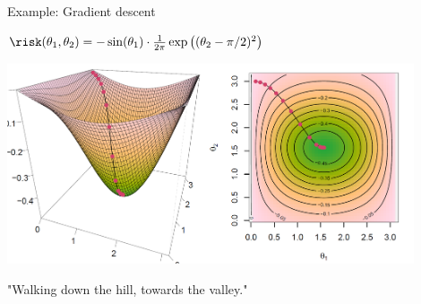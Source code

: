 \begin{vbframe}{Example: Gradient descent }
  \begin{center}
    $\risk(\theta_1, \theta_2) = -\sin(\theta_1) \cdot \frac{1}{2\pi} \exp\left( (\theta_2 - \pi / 2)^2 \right)$

\begin{center}
\includegraphics[width=0.9\textwidth]{plots/gradient-descent.png}
\end{center}


  \end{center}
\hspace{2cm} "Walking down the hill, towards the valley."\\
\end{vbframe}

